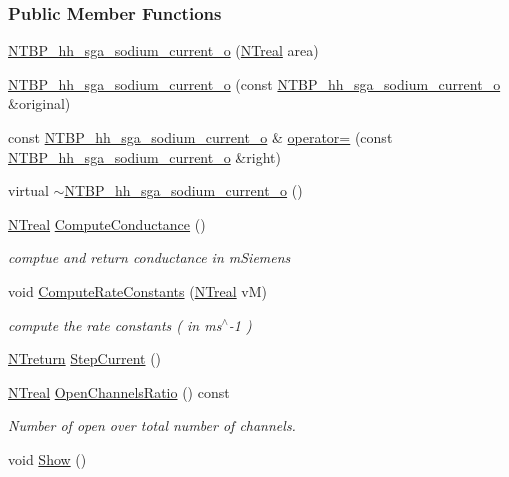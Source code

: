\subsubsection*{Public Member Functions}
\begin{DoxyCompactItemize}
\item 
\hyperlink{class_n_t_b_p__hh__sga__sodium__current__o_a5969d1fd318e2027a7acbacd750aede7}{NTBP\_\-hh\_\-sga\_\-sodium\_\-current\_\-o} (\hyperlink{nt__types_8h_a814a97893e9deb1eedcc7604529ba80d}{NTreal} area)
\item 
\hyperlink{class_n_t_b_p__hh__sga__sodium__current__o_a678ef5e7bc00edb69d285781195bb415}{NTBP\_\-hh\_\-sga\_\-sodium\_\-current\_\-o} (const \hyperlink{class_n_t_b_p__hh__sga__sodium__current__o}{NTBP\_\-hh\_\-sga\_\-sodium\_\-current\_\-o} \&original)
\item 
const \hyperlink{class_n_t_b_p__hh__sga__sodium__current__o}{NTBP\_\-hh\_\-sga\_\-sodium\_\-current\_\-o} \& \hyperlink{class_n_t_b_p__hh__sga__sodium__current__o_a8c4303580521b8cc80e550dbb84fa941}{operator=} (const \hyperlink{class_n_t_b_p__hh__sga__sodium__current__o}{NTBP\_\-hh\_\-sga\_\-sodium\_\-current\_\-o} \&right)
\item 
virtual \hyperlink{class_n_t_b_p__hh__sga__sodium__current__o_a9c912fe4e0494876083c6599c37c0f15}{$\sim$NTBP\_\-hh\_\-sga\_\-sodium\_\-current\_\-o} ()
\item 
\hyperlink{nt__types_8h_a814a97893e9deb1eedcc7604529ba80d}{NTreal} \hyperlink{class_n_t_b_p__hh__sga__sodium__current__o_af2cf6cbb1a961c5bd0930e5b3a710b17}{ComputeConductance} ()
\begin{DoxyCompactList}\small\item\em comptue and return conductance in mSiemens \item\end{DoxyCompactList}\item 
void \hyperlink{class_n_t_b_p__hh__sga__sodium__current__o_aec1d67be685faa24c9fcf5024e7e35d5}{ComputeRateConstants} (\hyperlink{nt__types_8h_a814a97893e9deb1eedcc7604529ba80d}{NTreal} vM)
\begin{DoxyCompactList}\small\item\em compute the rate constants ( in ms$^\wedge$-\/1 ) \item\end{DoxyCompactList}\item 
\hyperlink{nt__types_8h_ab9564ee8f091e809d21b8451c6683c53}{NTreturn} \hyperlink{class_n_t_b_p__hh__sga__sodium__current__o_a127f55cd2fdbecb48c118a80c1cca2b6}{StepCurrent} ()
\item 
\hyperlink{nt__types_8h_a814a97893e9deb1eedcc7604529ba80d}{NTreal} \hyperlink{class_n_t_b_p__hh__sga__sodium__current__o_a968c15bafacfc1fa3978e69647bc267d}{OpenChannelsRatio} () const 
\begin{DoxyCompactList}\small\item\em Number of open over total number of channels. \item\end{DoxyCompactList}\item 
void \hyperlink{class_n_t_b_p__hh__sga__sodium__current__o_aa832aff792354d928e38bbd8ea17eaa4}{Show} ()
\end{DoxyCompactItemize}


